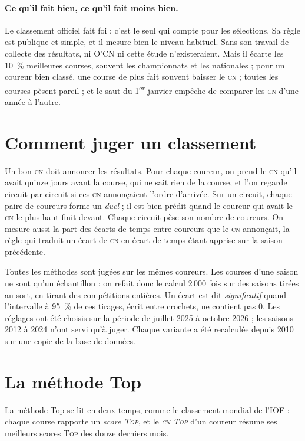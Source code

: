 \documentclass[11pt,a4paper]{article}
\newcommand{\Top}{\textsc{Top}}
\newcommand{\CN}{\textsc{cn}}
\begin{document}
\paragraph{Ce qu'il fait bien, ce qu'il fait moins bien.} Le classement officiel fait foi : c'est le seul qui compte pour les sélections. Sa règle est publique et simple, et il mesure bien le niveau habituel. Sans son travail de collecte des résultats, ni O'CN ni cette étude n'existeraient. Mais il écarte les 10~\% meilleures courses, souvent les championnats et les nationales ; pour un coureur bien classé, une course de plus fait souvent baisser le \CN{} ; toutes les courses pèsent pareil ; et le saut du 1\textsuperscript{er} janvier empêche de comparer les \CN{} d'une année à l'autre.

\section{Comment juger un classement}

Un bon \CN{} doit annoncer les résultats. Pour chaque coureur, on prend le \CN{} qu'il avait quinze jours avant la course, qui ne sait rien de la course, et l'on regarde circuit par circuit si ces \CN{} annonçaient l'ordre d'arrivée. Sur un circuit, chaque paire de coureurs forme un \emph{duel} ; il est bien prédit quand le coureur qui avait le \CN{} le plus haut finit devant. Chaque circuit pèse son nombre de coureurs. On mesure aussi la part des écarts de temps entre coureurs que le \CN{} annonçait, la règle qui traduit un écart de \CN{} en écart de temps étant apprise sur la saison précédente.

Toutes les méthodes sont jugées sur les mêmes coureurs. Les courses d'une saison ne sont qu'un échantillon : on refait donc le calcul 2\,000 fois sur des saisons tirées au sort, en tirant des compétitions entières. Un écart est dit \emph{significatif} quand l'intervalle à 95~\% de ces tirages, écrit entre crochets, ne contient pas 0. Les réglages ont été choisis sur la période de juillet 2025 à octobre 2026 ; les saisons 2012 à 2024 n'ont servi qu'à juger. Chaque variante a été recalculée depuis 2010 sur une copie de la base de données.

\section{La méthode Top}

La méthode Top se lit en deux temps, comme le classement mondial de l'IOF : chaque course rapporte un \emph{score \Top}, et le \emph{\CN{} \Top} d'un coureur résume ses meilleurs scores \Top{} des douze derniers mois.
\end{document}
